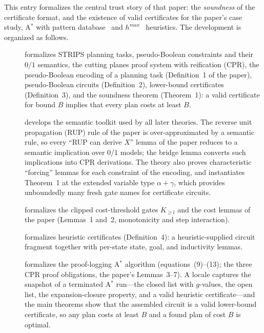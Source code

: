 \documentclass[11pt,a4paper]{article}
\begin{document}
This entry formalizes the central trust story of that paper: the
\emph{soundness} of the certificate format, and the existence of valid
certificates for the paper's case study, A$^*$ with pattern
database~\cite{Edelkamp01} and $h^{\mathit{max}}$~\cite{BonetG01} heuristics.
The development is organized as follows.

\begin{description}
\item[] formalizes STRIPS planning tasks,
pseudo-Boolean constraints and their $0/1$ semantics, the cutting planes proof
system with reification (CPR), the pseudo-Boolean encoding of a planning task
(Definition~1 of the paper), pseudo-Boolean circuits (Definition~2),
lower-bound certificates (Definition~3), and the soundness theorem
(Theorem~1): a valid certificate for bound $B$ implies that every plan costs
at least $B$.

\item[] develops the semantic toolkit used by all
later theories. The reverse unit propagation (RUP) rule of the paper is
over-approximated by a semantic rule, so every ``RUP can derive $X$'' lemma of
the paper reduces to a semantic implication over $0/1$ models; the bridge
lemma  converts such implications into CPR
derivations. The theory also proves characteristic ``forcing'' lemmas for each
constraint of the encoding, and instantiates Theorem~1 at the extended
variable type $\alpha + \gamma$, which provides unboundedly many fresh gate
names for certificate circuits.

\item[] formalizes the clipped cost-threshold gates
$K_{\geq l}$ and the cost lemmas of the paper (Lemmas~1 and~2, monotonicity
and step interaction).

\item[] formalizes heuristic certificates
(Definition~4): a heuristic-supplied circuit fragment together with per-state
state, goal, and inductivity lemmas.

\item[] formalizes the proof-logging A$^*$
algorithm (equations~(9)--(13); the three CPR proof obligations,
the paper's Lemmas~3--7).  A locale captures the
snapshot of a terminated A$^*$ run---the closed list with $g$-values, the open
list, the expansion-closure property, and a valid heuristic certificate---and
the main theorems show that the assembled circuit is a valid lower-bound
certificate, so any plan costs at least $B$ and a found plan of cost $B$ is
optimal.


\end{description}
\end{document}
